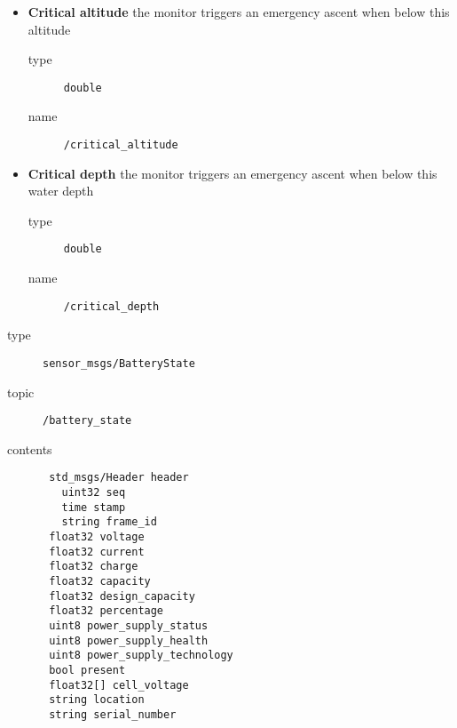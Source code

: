 \documentclass[9pt,technote]{IEEEtran} %
\begin{document}
\begin{itemize}
\item \textbf{Critical altitude} the monitor triggers an emergency ascent when below this altitude \begin{description}
\item[type] \texttt{double}
\item[name] \texttt{/critical\_altitude}
\end{description}
\item \textbf{Critical depth} the monitor triggers an emergency ascent when below this water depth \begin{description}
\item[type] \texttt{double}
\item[name] \texttt{/critical\_depth}
\end{description}  
\end{itemize}

\begin{description}
\item[type] \texttt{sensor\_msgs/BatteryState}
\item[topic] \texttt{/battery\_state}
\item[contents] \begin{scriptsize}
\begin{verbatim}
 std_msgs/Header header
   uint32 seq
   time stamp
   string frame_id
 float32 voltage
 float32 current
 float32 charge
 float32 capacity
 float32 design_capacity
 float32 percentage
 uint8 power_supply_status
 uint8 power_supply_health
 uint8 power_supply_technology
 bool present
 float32[] cell_voltage
 string location
 string serial_number
\end{verbatim}
\end{scriptsize}
\end{description}


%
%
\end{document}

